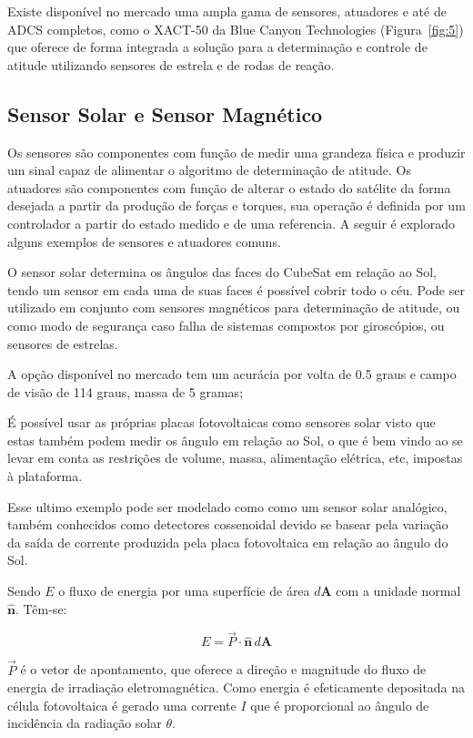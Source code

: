 Existe disponível no mercado uma ampla gama de sensores, atuadores e até de ADCS completos, como o XACT-50 da Blue Canyon Technologies  (Figura~\ref{fig:5}) que oferece de forma integrada a solução para a determinação e controle de atitude utilizando sensores de estrela e de rodas de reação.

\subsection{Sensor Solar e Sensor Magnético}\label{sec:3.1.4.1}

Os sensores são componentes com  função de medir uma grandeza física e produzir um sinal capaz de alimentar o algoritmo de determinação de atitude. Os atuadores são componentes com função de alterar o estado do satélite da forma desejada a partir da produção de forças e torques, sua operação é definida por um controlador a partir do estado medido e de uma referencia. A seguir é explorado alguns exemplos de sensores e atuadores comuns.

O sensor solar determina os ângulos das faces do CubeSat em relação ao Sol, tendo um sensor em cada uma de suas faces é possível cobrir todo o céu. Pode ser utilizado em conjunto com sensores magnéticos para determinação de atitude, ou como modo de segurança caso falha de sistemas compostos por giroscópios, ou sensores de estrelas.

A opção disponível no mercado tem um acurácia por volta de 0.5 graus e campo de visão de 114 graus, massa de 5 gramas;

É possível usar as próprias placas fotovoltaicas como sensores solar visto que estas também podem medir os ângulo em relação ao Sol, o que é bem vindo ao se  levar em conta as restrições de volume, massa, alimentação elétrica, etc, impostas à plataforma\cite{baroni2020attitude}.

Esse ultimo exemplo pode ser modelado como como um sensor solar analógico, também conhecidos como detectores cossenoidal devido se basear pela variação da saída de corrente produzida pela placa fotovoltaica em relação ao ângulo do Sol.

Sendo $E$ o fluxo de energia por uma superfície de área $d\mathbf{A}$ com a unidade normal $\hat{\mathbf{n}}$. Têm-se:

\begin{equation}
E=\vec{P} \cdot \hat{\mathbf{n}}\, d\mathbf{A}
\end{equation}

$\vec{P}$ é o vetor de apontamento, que oferece a direção e magnitude do fluxo de energia de irradiação eletromagnética. Como energia é efeticamente depositada na célula fotovoltaica é gerado uma corrente $I$ que é proporcional ao ângulo de incidência da radiação solar $\theta$.

